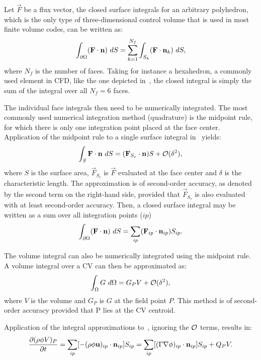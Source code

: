 Let $\vec{F}$ be a flux vector, the closed surface integrals for an arbitrary polyhedron, which is the only type of three-dimensional control volume that is used in most finite volume codes, can be written as:
\begin{equation}
    \int_{\partial \Omega} (\mathbf{F}\cdot \mathbf{n})~dS = \sum_{k=1}^{N_f} \int_{S_k} (\mathbf{F}\cdot\mathbf{n}_k)~dS
    \label{eq:surfint},
\end{equation}
where $N_f$ is the number of faces. Taking for instance a hexahedron, a commonly used element in CFD, like the one depicted in~, the closed integral is simply the sum of the integral over all $N_f = 6$ faces.

The individual face integrals then need to be numerically integrated. The most commonly used numerical integration method (quadrature) is the midpoint rule, for which there is only one integration point placed at the face center. Application of the midpoint rule to a single surface integral in~ yields:
\begin{equation*}
   \int_{S} \mathbf{F}\cdot\mathbf{n}~dS = (\mathbf{F}_{S_c}\cdot\mathbf{n}) S + \mathcal{O}(\delta^2),
\end{equation*}
where $S$ is the surface area, $\vec{F}_{S_c}$ is $\vec{F}$ evaluated at the face center and $\delta$ is the characteristic length.  The approximation is of second-order accuracy, as denoted by the second term on the right-hand side, provided that $\vec{F}_{S_c}$ is also evaluated with at least second-order accuracy. Then, a closed surface integral may be written as a sum over all integration points ($ip$)
\begin{equation*}
    \int_{\partial \Omega} (\mathbf{F}\cdot\mathbf{n})~dS = \sum_{ip} (\mathbf{F}_{ip}\cdot\mathbf{n}_{ip}) S_{ip}.
\end{equation*}

The volume integral can also be numerically integrated using the midpoint rule. A volume integral over a CV can then be approximated as:
\begin{equation*}
    \int_\Omega G~d\Omega = G_{P} V + \mathcal{O}(\delta^2),
\end{equation*}
where $V$ is the volume and $G_{P}$ is $G$ at the field point $P$. This method is of second-order accuracy provided that P lies at the CV centroid.

Application of the integral approximations to~, ignoring the $\mathcal{O}$ terms, results in:
\begin{equation}
     \frac{\partial (\rho\phi V )_P}{\partial t} 
    =
    \sum_{ip} [-(\rho\phi\mathbf{u})_{ip}\cdot\mathbf{n}_{ip}] S_{ip}
    = \sum_{ip} [(\Gamma\nabla\phi)_{ip}\cdot\mathbf{n}_{ip}] S_{ip}
    + Q_P V
    \label{eq:spatial}.
\end{equation}

